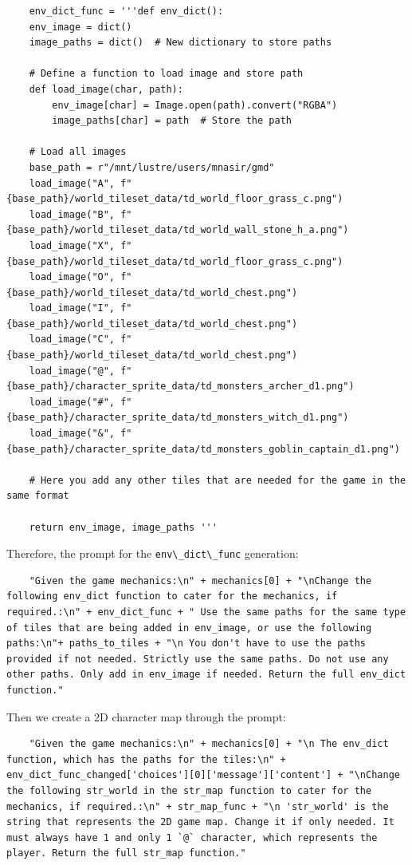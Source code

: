 \documentclass{article} %
\begin{document}
\begin{lstlisting}
    env_dict_func = '''def env_dict():
    env_image = dict()
    image_paths = dict()  # New dictionary to store paths
    
    # Define a function to load image and store path
    def load_image(char, path):
        env_image[char] = Image.open(path).convert("RGBA")
        image_paths[char] = path  # Store the path
    
    # Load all images
    base_path = r"/mnt/lustre/users/mnasir/gmd"
    load_image("A", f"{base_path}/world_tileset_data/td_world_floor_grass_c.png")
    load_image("B", f"{base_path}/world_tileset_data/td_world_wall_stone_h_a.png")
    load_image("X", f"{base_path}/world_tileset_data/td_world_floor_grass_c.png")
    load_image("O", f"{base_path}/world_tileset_data/td_world_chest.png")
    load_image("I", f"{base_path}/world_tileset_data/td_world_chest.png")
    load_image("C", f"{base_path}/world_tileset_data/td_world_chest.png")
    load_image("@", f"{base_path}/character_sprite_data/td_monsters_archer_d1.png")
    load_image("#", f"{base_path}/character_sprite_data/td_monsters_witch_d1.png")
    load_image("&", f"{base_path}/character_sprite_data/td_monsters_goblin_captain_d1.png")

    # Here you add any other tiles that are needed for the game in the same format
    
    return env_image, image_paths '''
\end{lstlisting}

Therefore, the prompt for the \lstinline|env\_dict\_func| generation:

\begin{lstlisting}
    "Given the game mechanics:\n" + mechanics[0] + "\nChange the following env_dict function to cater for the mechanics, if required.:\n" + env_dict_func + " Use the same paths for the same type of tiles that are being added in env_image, or use the following paths:\n"+ paths_to_tiles + "\n You don't have to use the paths provided if not needed. Strictly use the same paths. Do not use any other paths. Only add in env_image if needed. Return the full env_dict function."
\end{lstlisting}

Then we create a 2D character map through the prompt:

\begin{lstlisting}
    "Given the game mechanics:\n" + mechanics[0] + "\n The env_dict function, which has the paths for the tiles:\n" + env_dict_func_changed['choices'][0]['message']['content'] + "\nChange the following str_world in the str_map function to cater for the mechanics, if required.:\n" + str_map_func + "\n 'str_world' is the string that represents the 2D game map. Change it if only needed. It must always have 1 and only 1 `@` character, which represents the player. Return the full str_map function."
\end{lstlisting}
\end{document}
